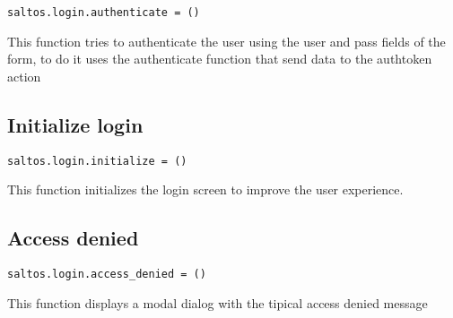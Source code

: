 \documentclass[a4paper]{book}
\begin{document}
\begin{lstlisting}
saltos.login.authenticate = ()
\end{lstlisting}

This function tries to authenticate the user using the user and pass fields of the form, to do
it uses the authenticate function that send data to the authtoken action

\hypertarget{toc589}{}
\subsection{Initialize login}

\begin{lstlisting}
saltos.login.initialize = ()
\end{lstlisting}

This function initializes the login screen to improve the user experience.

\hypertarget{toc590}{}
\subsection{Access denied}

\begin{lstlisting}
saltos.login.access_denied = ()
\end{lstlisting}

This function displays a modal dialog with the tipical access denied message

\end{document}
